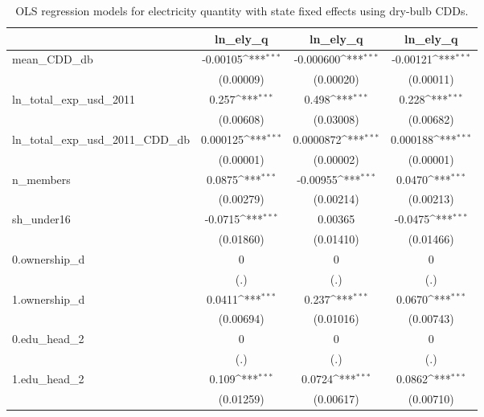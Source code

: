 \begin{table}[htbp]\centering\footnotesize{
\def\sym#1{\ifmmode^{#1}\else\(^{#1}\)\fi}
\caption{OLS regression models for electricity quantity with state fixed effects using dry-bulb CDDs. \label{ely_reg_db}}
\begin{tabular}{l*{3}{c}}
\hline\hline
            &\multicolumn{1}{c}{ln_ely_q}&\multicolumn{1}{c}{ln_ely_q}&\multicolumn{1}{c}{ln_ely_q}\\
\hline
mean_CDD_db &    -0.00105\sym{***}&   -0.000600\sym{***}&    -0.00121\sym{***}\\
            &   (0.00009)         &   (0.00020)         &   (0.00011)         \\
ln_total_exp_usd_2011&       0.257\sym{***}&       0.498\sym{***}&       0.228\sym{***}\\
            &   (0.00608)         &   (0.03008)         &   (0.00682)         \\
ln_total_exp_usd_2011_CDD_db&    0.000125\sym{***}&   0.0000872\sym{***}&    0.000188\sym{***}\\
            &   (0.00001)         &   (0.00002)         &   (0.00001)         \\
n_members   &      0.0875\sym{***}&    -0.00955\sym{***}&      0.0470\sym{***}\\
            &   (0.00279)         &   (0.00214)         &   (0.00213)         \\
sh_under16  &     -0.0715\sym{***}&     0.00365         &     -0.0475\sym{***}\\
            &   (0.01860)         &   (0.01410)         &   (0.01466)         \\
0.ownership_d&           0         &           0         &           0         \\
            &         (.)         &         (.)         &         (.)         \\
1.ownership_d&      0.0411\sym{***}&       0.237\sym{***}&      0.0670\sym{***}\\
            &   (0.00694)         &   (0.01016)         &   (0.00743)         \\
0.edu_head_2&           0         &           0         &           0         \\
            &         (.)         &         (.)         &         (.)         \\
1.edu_head_2&       0.109\sym{***}&      0.0724\sym{***}&      0.0862\sym{***}\\
            &   (0.01259)         &   (0.00617)         &   (0.00710)         \\

\end{tabular}}
\end{table}
